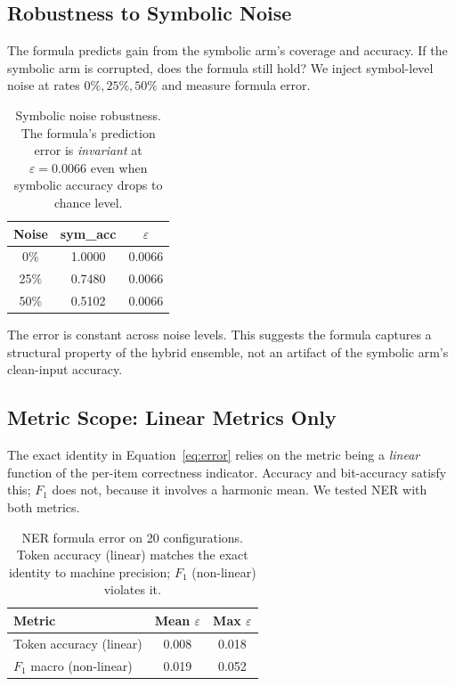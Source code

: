 \documentclass[11pt,a4paper]{article}
\begin{document}
\subsection{Robustness to Symbolic Noise}
\label{sec:robustness}

The formula predicts gain from the symbolic arm's coverage and
accuracy. If the symbolic arm is corrupted, does the formula still
hold? We inject symbol-level noise at rates $0\%, 25\%, 50\%$ and
measure formula error.

\begin{table}[h]
\centering
\caption{Symbolic noise robustness. The formula's prediction error
is \emph{invariant} at $\varepsilon = 0.0066$ even when symbolic
accuracy drops to chance level.}
\label{tab:noise}
\small
\begin{tabular}{ccc}
\toprule
Noise & sym\_acc & $\varepsilon$ \\
\midrule
0\%  & 1.0000 & 0.0066 \\
25\% & 0.7480 & 0.0066 \\
50\% & 0.5102 & 0.0066 \\
\bottomrule
\end{tabular}
\end{table}

The error is constant across noise levels. This suggests the formula
captures a structural property of the hybrid ensemble, not an
artifact of the symbolic arm's clean-input accuracy.


\subsection{Metric Scope: Linear Metrics Only}
\label{sec:metric-scope}

The exact identity in Equation~\ref{eq:error} relies on the metric
being a \emph{linear} function of the per-item correctness indicator.
Accuracy and bit-accuracy satisfy this; $F_1$ does not, because it
involves a harmonic mean. We tested NER with both metrics.

\begin{table}[h]
\centering
\caption{NER formula error on 20 configurations. Token accuracy
(linear) matches the exact identity to machine precision; $F_1$
(non-linear) violates it.}
\label{tab:metric-scope}
\small
\begin{tabular}{lcc}
\toprule
Metric & Mean $\varepsilon$ & Max $\varepsilon$ \\
\midrule
Token accuracy (linear)   & 0.008 & 0.018 \\
$F_1$ macro (non-linear)  & 0.019 & 0.052 \\
\bottomrule
\end{tabular}
\end{table}
\end{document}
